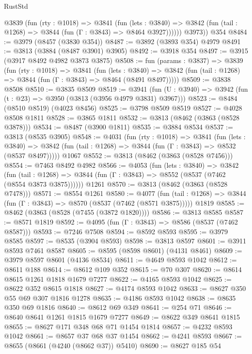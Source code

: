 \begin{lexlean}{RustStd}
\begin{coremodule}
          @3839
            (fun (rty : @1018) =>
            @3841
              (fun (lets : @3840) =>
              @3842 (fun (tail : @1268) => @3844 (fun (Γ : @3843) => @8464 @3927))))))
        @3973))
    @354
@8484 := @3979 (@8457 (@3830 @354))
@8487 := @3892 (@3893 @354) @4979
@8491 := @3813 (@3884 (@8487 @3901) @3905)
@8492 := @3918 @354
@8497 := @3915 (@3917 @8492 @4982 @3873 @3875)
@8508 := fun (params : @3837) =>
  @3839
    (fun (rty : @1018) =>
    @3841
      (fun (lets : @3840) =>
      @3842 (fun (tail : @1268) => @3844 (fun (Γ : @3843) => @8464 (@8491 @8497)))))
@8509 := @3838 @8508
@8510 := @3835 @8509
@8519 := @3941 (fun (U : @3940) => @3942 (fun (t : @23) => @3950 (@3813 (@3956 @4979 @3831) @3967)))
@8523 := @8484 (@8510 @8519) (@4023 @8456)
@8525 := @3798 @8509 @8519
@8527 := @4028 @8508 @1811
@8528 := @3865 @1811
@8532 := @3813 (@8462 (@3863 (@8528 @3878)))
@8534 := @8487 (@3900 @1811)
@8535 := @3884 @8534
@8537 := @3813 (@8535 @3905)
@8548 := @4031
    (fun (rty : @1018) =>
    @3841
      (fun (lets : @3840) =>
      @3842 (fun (tail : @1268) => @3844 (fun (Γ : @3843) => @8532 (@8537 @8497)))))
    @1067
@8552 := @3813 (@8462 (@3863 (@8528 @7456)))
@8554 := @7463 @8492 @4982
@8566 := @4053
    (fun (lets : @3840) =>
    @3842
      (fun (tail : @1268) => @3844 (fun (Γ : @3843) => @8552 (@8537 (@7462 (@8554 @3873 @3875))))))
    @1261
@8570 := @3813 (@8462 (@3863 (@8528 @7478)))
@8571 := @8554 @1261
@8580 := @4077
    (fun (tail : @1268) => @3844 (fun (Γ : @3843) => @8570 (@8537 (@7462 (@8571 @3875)))))
    @1819
@8585 := @8462 (@3863 (@8528 (@7455 (@3872 @1820))))
@8586 := @3813 @8585
@8587 := @8571 @1819
@8592 := @4095 (fun (Γ : @3843) => @8586 (@8537 (@7462 @8587)))
@8593 := @7246 @7508
@8594 := @8592 @8593
@8595 := @3979 @8585
@8597 := @8535 (@3904 @8593)
@8598 := @3813 @8597
@8601 := @3911 @8593 @7461 @8587
@8605 := @8595 (@8598 @8601) (@4131 @8461)
@8609 := @3979 @8597 @8601 (@4136 @8534)
@8611 := @4649 @8593 @1042
@8612 := @8611 @188
@8614 := @8612 @109 @352
@8615 := @70 @307
@8620 := @8614 @8615 @1261 @1818 @1679 @7277
@8622 := @4165 @8593 @1042
@8625 := @8622 @352 @8615 @1818
@8627 := @4174 @8593 @1042
@8633 := @8627 @350 @55 @69 @307 @1816 @1278
@8635 := @4186 @8593 @1042
@8638 := @8635 @350 @69 @1816
@8640 := @8612 @69 @349
@8641 := @254 @71
@8646 := @8640 @8641 @1261 @1815 @1679 @7277
@8649 := @8622 @349 @8641 @1815
@8655 := @8627 @171 @348 @68 @71 @1454 @1814
@8657 := @4232 @8593 @1042
@8661 := @8657 @37 @68 @37 @1454
@8662 := @4241 @8593
@8667 := @8655 (@8661 (@4240 (@8662 @37)) @5410)
@8690 := @8627
    @185
    @54

\end{coremodule}
\end{lexlean}

